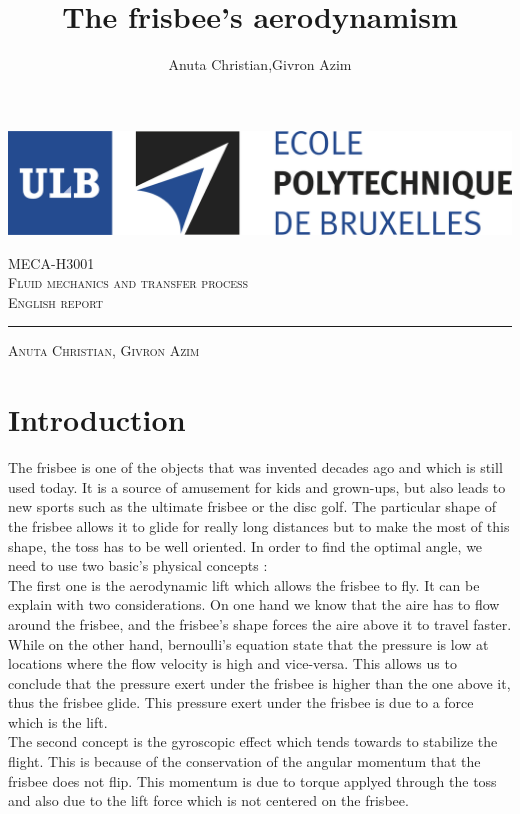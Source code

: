 \documentclass[10pt,a4paper]{report}
\author{Anuta Christian,Givron Azim}
\title{The frisbee's aerodynamism}
\begin{document}
\begin{titlepage}

\includegraphics[scale=0.5]{logo-polytech-ULB-FR.jpg}

\center 
\vspace{5cm}
\textsc{\large MECA-H3001} \\[0.5cm]
\textsc{\LARGE Fluid mechanics and transfer process} \\[1.5cm]
\textsc{\Large English report} %

\rule{\textwidth}{1pt}

\vspace{2cm}

\textsc{\large Anuta Christian, Givron Azim}

\end{titlepage}



\tableofcontents
\newpage 
\section{Introduction}
The frisbee is one of the objects that was invented decades ago and which is still used today. It is a source of amusement for kids and grown-ups, but also leads to new sports such as the ultimate frisbee or the disc golf. The particular shape of the frisbee allows it to glide for really long distances but to make the most of this shape, the toss has to be well oriented. In order to find the optimal angle, we need to use two basic’s physical concepts : 
\\The first one is the aerodynamic lift which allows the frisbee to fly. It can be explain with two considerations. On one hand we know that the aire has to flow around the frisbee, and the frisbee's shape forces the aire above it to travel faster. While on the other hand, bernoulli's equation state that the pressure is low at locations where the flow velocity is high and vice-versa. This allows us to conclude that the pressure exert under the frisbee is higher than the one above it, thus the frisbee glide. This pressure exert under the frisbee is due to a force which is the lift.
\\The second concept is the gyroscopic effect which tends towards to stabilize the flight. This is because of the conservation of the angular momentum that the frisbee does not flip. This momentum is due to torque applyed through the toss and also due to the lift force which is not centered on the frisbee.
\end{document}
